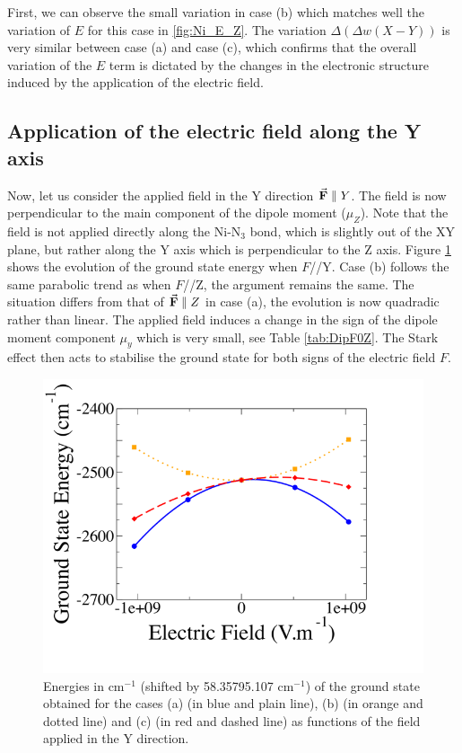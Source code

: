 \documentclass[12pt]{report}
\numberwithin{equation}{section}
\begin{document}
First, we can observe the small variation in case (b) which matches well the variation of $E$ for this case in \ref{fig:Ni_E_Z}.
The variation $\Delta (\Delta w(X-Y))$ is very similar between case (a) and case (c), which confirms that the overall variation of the $E$ term is dictated by the changes in the electronic structure induced by the application of the electric field.


\subsection{Application of the electric field along the Y axis}

Now, let us consider the applied field in the Y direction $\vec{\vb F}\parallel Y$.
The field is now perpendicular to the main component of the dipole moment ($\mu_Z$).
Note that the field is not applied directly along the Ni-N$_3$ bond, which is slightly out of the XY plane, but rather along the Y axis which is perpendicular to the Z axis.
Figure \ref{GSE_Y} shows the evolution of the ground state energy when $F$//Y.
Case (b) follows the same parabolic trend as when $F$//Z, the argument remains the same.
The situation differs from that of $\vec{\vb{F}}\parallel Z$ in case (a), the evolution is now quadradic rather than linear. 
The applied field induces a change in the sign of the dipole moment component $\mu_y$ which is very small, see Table \ref{tab:DipF0Z}.
The Stark effect then acts to stabilise the ground state for both signs of the electric field $F$.


\begin{figure}[!ht]
    \centering
    \includegraphics[width=\textwidth]{Images/E_Y.png}
    \caption[Energies of the ground state in the three cases (a),(b) and (c) for $\vec{\vb{F}}\parallel Y$]{Energies in cm$^{-1}$ (shifted by 58.35795.107 cm$^{-1}$) of the ground state obtained for the cases (a) (in blue and plain line), (b)
    (in orange and dotted line) and (c) (in red and dashed line) as functions of the field applied in the Y direction.}
    \label{GSE_Y}
\end{figure}
\end{document}
